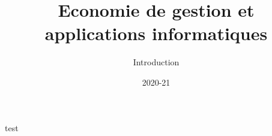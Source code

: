 \documentclass[xcolor=x11names,compress]{beamer}
\renewcommand{\(}{\begin{columns}}
\renewcommand{\)}{\end{columns}}
\newcommand{\<}[1]{\begin{column}{#1}}
\renewcommand{\>}{\end{column}}
\begin{document}
\begin{frame}
\title{Economie de gestion et applications informatiques}
\subtitle{Introduction}
%
%
\date{
	\vspace{1cm}
	2020-21 \\
}
\titlepage
\end{frame}  


\begin{frame}{}
test
\end{frame}


% 
\end{document}
